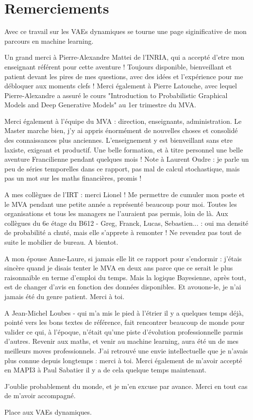 \chapter{Remerciements}\label{sec:Remerciements}

Avec ce travail sur les VAEs dynamiques se tourne une page siginificative de mon parcours en machine learning.

Un grand merci à Pierre-Alexandre Mattei de l'INRIA, qui a accepté d'etre mon enseignant référent pour cette aventure !
Toujours disponible, bienveillant et patient devant les pires de mes questions, avec des idées et l'expérience 
pour me débloquer aux moments clefs ! Merci également à Pierre Latouche, avec lequel Pierre-Alexandre a assuré 
le cours "Introduction to Probabilistic Graphical Models and Deep Generative Models" au 1er trimestre du MVA.

Merci également à l'équipe du MVA : direction, enseignants, administration. Le Master marche bien, j'y ai appris 
énormément de nouvelles choses et consolidé des connaissances plus anciennes. L'enseignement y est bienveillant sans 
etre laxiste, exigeant et productif. Une belle formation, et à titre personnel une belle aventure Francilienne 
pendant quelques mois ! Note à Laurent Oudre : je parle un peu de séries temporelles dans ce rapport, pas mal de 
calcul stochastique, mais pas un mot sur les maths financières, promis !

A mes collègues de l'IRT : merci Lionel ! Me permettre de cumuler mon poste et le MVA pendant une petite année a 
représenté beaucoup pour moi. Toutes les organisations et tous les managers ne l'auraient pas permis, loin de là. 
Aux collègues du 6e étage du B612 - Greg, Franck, Lucas, Sebastien... : oui ma densité de probabilité a chuté, 
mais elle s'apprete à remonter ! Ne revendez pas tout de suite le mobilier de bureau. A bientot.

A mon épouse Anne-Laure, si jamais elle lit ce rapport pour s'endormir : j'étais sincère quand je disais tenter le MVA en deux ans 
parce que ce serait le plus raisonnaible en terme d'emploi du temps. Mais la logique Bayesienne, après tout, est de changer d'avis 
en fonction des données disponibles. Et avouons-le, je n'ai jamais été du genre patient. Merci à toi.

A Jean-Michel Loubes - qui m'a mis le pied à l'étrier il y a quelques temps déjà, pointé vers les bons textes de référence, fait 
rencontrer beaucoup de monde pour valider ce qui, à l'époque, n'était qu'une piste d'évolution professionnelle parmis d'autres. 
Revenir aux maths, et venir au machine learning, aura été un de mes meilleurs moves professionnels. J'ai retrouvé une envie 
intellectuelle que je n'avais plus connue depuis longtemps : merci à toi. 
Merci également de m'avoir accepté en MAPI3 à Paul Sabatier il y a de cela quelque temps maintenant.

J'oublie probablement du monde, et je m'en excuse par avance. Merci en tout cas de m'avoir accompagné.

Place aux VAEs dynamiques.
